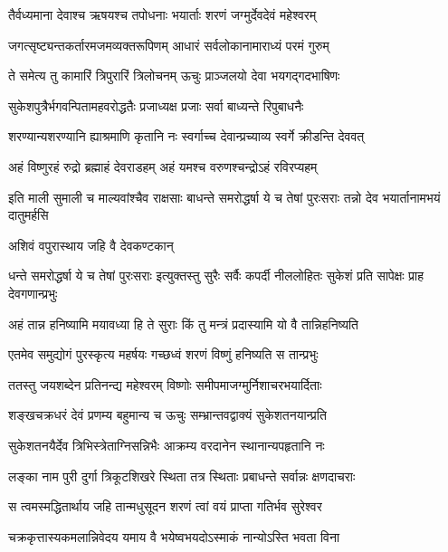 
\twolineshloka
{तैर्वध्यमाना देवाश्च ऋषयश्च तपोधनाः}
{भयार्ताः शरणं जग्मुर्देवदेवं महेश्वरम्} %

\twolineshloka
{जगत्सृष्ट्यन्तकर्तारमजमव्यक्तरूपिणम्}
{आधारं सर्वलोकानामाराध्यं परमं गुरुम्} %

\twolineshloka
{ते समेत्य तु कामारिं त्रिपुरारिं त्रिलोचनम्}
{ऊचुः प्राञ्जलयो देवा भयगद्गदभाषिणः} %

\twolineshloka
{सुकेशपुत्रैर्भगवन्पितामहवरोद्धतैः}
{प्रजाध्यक्ष प्रजाः सर्वा बाध्यन्ते रिपुबाधनैः} %

\twolineshloka
{शरण्यान्यशरण्यानि ह्याश्रमाणि कृतानि नः}
{स्वर्गाच्च देवान्प्रच्याव्य स्वर्गे क्रीडन्ति देववत्} %

\twolineshloka
{अहं विष्णुरहं रुद्रो ब्रह्माहं देवराडहम्}
{अहं यमश्च वरुणश्चन्द्रोऽहं रविरप्यहम्} %

\threelineshloka
{इति माली सुमाली च माल्यवांश्चैव राक्षसाः}
{बाधन्ते समरोद्धर्षा ये च तेषां पुरःसराः}
{तन्नो देव भयार्तानामभयं दातुमर्हसि} %

\onelineshloka
{अशिवं वपुरास्थाय जहि वै देवकण्टकान्} %

\threelineshloka
{धन्ते समरोद्धर्षा ये च तेषां पुरःसराः}
{इत्युक्तस्तु सुरैः सर्वैः कपर्दी नीललोहितः}
{सुकेशं प्रति सापेक्षः प्राह देवगणान्प्रभुः} %

\twolineshloka
{अहं तान्न हनिष्यामि मयावध्या हि ते सुराः}
{किं तु मन्त्रं प्रदास्यामि यो वै तान्निहनिष्यति} %

\twolineshloka
{एतमेव समुद्योगं पुरस्कृत्य महर्षयः}
{गच्छध्वं शरणं विष्णुं हनिष्यति स तान्प्रभुः} %

\twolineshloka
{ततस्तु जयशब्देन प्रतिनन्द्य महेश्वरम्}
{विष्णोः समीपमाजग्मुर्निशाचरभयार्दिताः} %

\twolineshloka
{शङ्खचक्रधरं देवं प्रणम्य बहुमान्य च}
{ऊचुः सम्भ्रान्तवद्वाक्यं सुकेशतनयान्प्रति} %

\twolineshloka
{सुकेशतनयैर्देव त्रिभिस्त्रेताग्निसन्निभैः}
{आक्रम्य वरदानेन स्थानान्यपहृतानि नः} %

\twolineshloka
{लङ्का नाम पुरी दुर्गा त्रिकूटशिखरे स्थिता}
{तत्र स्थिताः प्रबाधन्ते सर्वान्नः क्षणदाचराः} %

\twolineshloka
{स त्वमस्मद्धितार्थाय जहि तान्मधुसूदन}
{शरणं त्वां वयं प्राप्ता गतिर्भव सुरेश्वर} %

\twolineshloka
{चक्रकृत्तास्यकमलान्निवेदय यमाय वै}
{भयेष्वभयदोऽस्माकं नान्योऽस्ति भवता विना} %

